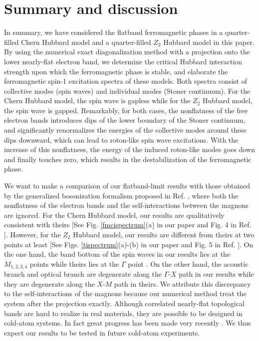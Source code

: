 \documentclass[amsmath,superscriptaddress,showpacs,aps,prb,twocolumn]{revtex4-1}
\begin{document}
\section{Summary and discussion}\label{sd}
\par In summary, we have considered the flatband ferromagnetic phases in a quarter-filled Chern Hubbard model and a quarter-filled $Z_2$ Hubbard model in this paper. By using the numerical exact diagonalization method with a projection onto the lower nearly-flat electron band, we determine the critical Hubbard interaction strength upon which the ferromagnetic phase is stable, and elaborate the ferromagnetic spin-1 excitation spectra of these models. Both spectra consist of collective modes (spin waves) and individual modes (Stoner continuum). For the Chern Hubbard model, the spin wave is gapless while for the $Z_2$ Hubbard model, the spin wave is gapped. Remarkably, for both cases, the nonflatness of the free electron bands introduces dips of the lower boundary of the Stoner continuum, and significantly renormalizes the energies of the collective modes around these dips downward, which can lead to roton-like spin wave excitations. With the increase of this nonflatness, the energy of the induced roton-like modes goes down and finally touches zero, which results in the destabilization of the ferromagnetic phase.

\par We want to make a comparison of our flatband-limit results with those obtained by the generalized bosonization formalism proposed in Ref. \cite{DG_PRB2015}, where both the nonflatness of the electron bands and the self-interactions between the magnons are ignored. For the Chern Hubbard model, our results are qualitatively consistent with theirs [See Fig. \ref{fmcispectrum}(a) in our paper and Fig. 4 in Ref. \cite{DG_PRB2015}]. However, for the $Z_2$ Hubbard model, our results are different from theirs at two points at least [See Figs. \ref{tispectrum}(a)-(b) in our paper and Fig. 5 in Ref. \cite{DG_PRB2015}]. On the one hand, the band bottom of the spin waves in our results lies at the $M_{1,2,3,4}$ points while theirs lies at the $\Gamma$ point . On the other hand, the acoustic branch and optical branch are degenerate along the $\Gamma$-$X$ path in our results while they are degenerate along the $X$-$M$ path in theirs. We attribute this discrepancy to the self-interactions of the magnons because our numerical method treat the system after the projection exactly. Although correlated nearly-flat topological bands are hard to realize in real materials, they are possible to be designed in cold-atom systems. In fact great progress has been made very recently \cite{LCJPS_N2009,AALBPB_PRL2013,MSKBK_PRL2013,JMDLUGE_N2014}. We thus expect our results to be tested in future cold-atom experiments.
\end{document}
